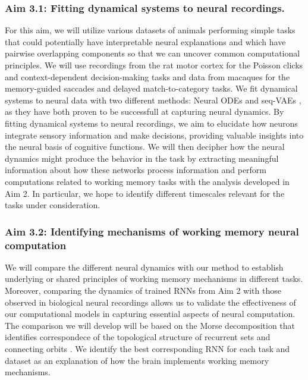 \documentclass[12pt,letterpaper, onecolumn]{article}
\theoremstyle{definition}
\theoremstyle{remark}
\begin{document}
\subsubsection*{Aim 3.1: Fitting dynamical systems to neural recordings.}
For this aim, we will utilize various datasets of animals performing simple tasks that could potentially have interpretable neural explanations and which have pairwise overlapping components so that we can uncover common computational principles.
We will use recordings from the rat motor cortex for the Poisson clicks \citep{brunton2013rats} and context-dependent decision-making tasks \citep{mante2013context} and data from macaques for the memory-guided saccades \citep{wimmer2014} and delayed match-to-category tasks.
%
We fit dynamical systems to neural data with two different methods:
 Neural ODEs \citep{kim2021inferring} and 
 seq-VAEs \citep{pandarinath2018inferring}, as they have both proven to be successfull at capturing neural dynamics.
By fitting dynamical systems to neural recordings, we aim to elucidate how neurons integrate sensory information and make decisions, providing valuable insights into the neural basis of cognitive functions.
We will then decipher how the neural dynamics might produce the behavior in the task by extracting meaningful information about how these networks process information and perform computations related to working memory tasks with the analysis developed in Aim 2. 
In particular, we hope to identify different timescales relevant for the tasks under consideration.

\subsubsection*{Aim 3.2: Identifying mechanisms of working memory neural computation}
We will compare the different neural dynamics with our method to establish underlying or shared principles of working memory mechanisms in different tasks.
Moreover, comparing the dynamics of trained RNNs from Aim 2 with those observed in biological neural recordings allows us to validate the effectiveness of our computational models in capturing essential aspects of neural computation.
 The comparison we will develop will be based on the Morse decomposition that identifies correspondece of the topological structure of recurrent sets and connecting orbits \citep{arai2009database}.
We identify the best corresponding RNN for each task and dataset as an explanation of how the brain implements working memory mechanisms. %
 



\newpage
\printbibliography
\end{document}
